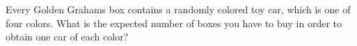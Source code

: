 Every Golden Grahams box contains a randomly colored toy car, which is one of four colors. What is the expected number of boxes you have to buy in order to obtain one car of each color?
